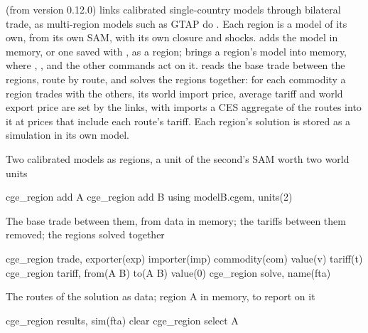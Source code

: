 

 (from version 0.12.0) links calibrated single-country models
through bilateral trade, as multi-region models such as GTAP do
\citep{hertel1997}. Each region is a model of its own, from its own SAM, with
its own closure and shocks.  adds the model in memory, or
one saved with , as a region;  brings a
region's model into memory, where , ,
 and the other commands act on it. 
reads the base trade between the regions, route by route, and
 solves the regions together: for each commodity a
region trades with the others, its world import price, average tariff and
world export price are set by the links, with imports a CES aggregate of the
routes into it at prices that include each route's tariff. Each region's
solution is stored as a simulation in its own model.


Two calibrated models as regions, a unit of the second's SAM worth two world
units
\begin{stcode}
cge_region add A
cge_region add B using modelB.cgem, units(2)
\end{stcode}
The base trade between them, from data in memory; the tariffs between them
removed; the regions solved together
\begin{stcode}
cge_region trade, exporter(exp) importer(imp) commodity(com) value(v) tariff(t)
cge_region tariff, from(A B) to(A B) value(0)
cge_region solve, name(fta)
\end{stcode}
The routes of the solution as data; region A in memory, to report on it
\begin{stcode}
cge_region results, sim(fta) clear
cge_region select A
\end{stcode}


